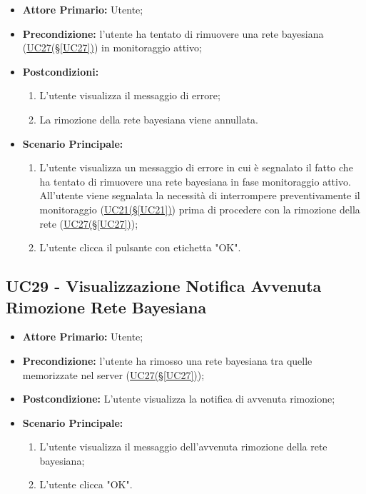 \begin{itemize}
	\item \textbf{Attore Primario:} Utente;
	\item \textbf{Precondizione:} l'utente ha tentato di rimuovere una rete bayesiana (\hyperref[UC27]{UC27(§\ref*{UC27})}) in monitoraggio attivo;
	\item \textbf{Postcondizioni:}
	\begin{enumerate}
		\item L'utente visualizza il messaggio di errore;
		\item La rimozione della rete bayesiana viene annullata.
	\end{enumerate}
	\item \textbf{Scenario Principale:}
	\begin{enumerate}
		\item L'utente visualizza un messaggio di errore in cui è segnalato il fatto che ha tentato di rimuovere una rete bayesiana in fase monitoraggio attivo. All'utente viene segnalata la necessità di interrompere preventivamente il monitoraggio (\hyperref[UC21]{UC21(§\ref*{UC21})}) prima di procedere con la rimozione della rete (\hyperref[UC27]{UC27(§\ref*{UC27})});
		\item L'utente clicca il pulsante con etichetta "OK".
	\end{enumerate}
\end{itemize}

\pagebreak

\subsection{UC29 - Visualizzazione Notifica Avvenuta Rimozione Rete Bayesiana}\label{UC29}

\begin{itemize}
	\item \textbf{Attore Primario:} Utente;
	\item \textbf{Precondizione:} l'utente ha rimosso una rete bayesiana tra quelle memorizzate nel server (\hyperref[UC27]{UC27(§\ref*{UC27})});
	\item \textbf{Postcondizione:} L'utente visualizza la notifica di avvenuta rimozione;
	\item \textbf{Scenario Principale:}
	\begin{enumerate}
		\item L'utente visualizza il messaggio dell'avvenuta rimozione della rete bayesiana;
		\item L'utente clicca "OK".
	\end{enumerate}
\end{itemize}

